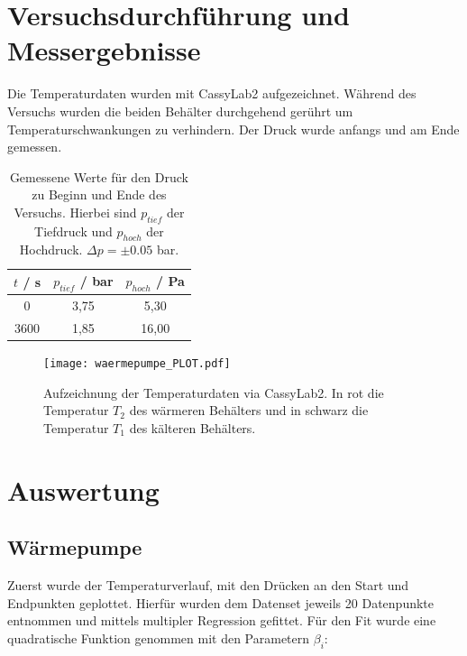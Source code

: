 \documentclass{article}
\begin{document}
\newpage
\section{Versuchsdurchf\"uhrung und Messergebnisse}
Die Temperaturdaten wurden mit CassyLab2 aufgezeichnet. Während des Versuchs wurden die beiden Behälter durchgehend gerührt um Temperaturschwankungen zu verhindern. Der Druck wurde anfangs und am Ende gemessen.

\begin{table}[!h]
\caption{Gemessene Werte für den Druck zu Beginn und Ende des Versuchs. Hierbei sind $p_{tief}$ der Tiefdruck und $p_{hoch}$ der Hochdruck. $\Delta p = \pm 0.05$ bar.}
\centering
\label{tab:items}
\begin{tabular}{|c|c|c|}
\hline
$t$ / s& $p_{tief}$ / bar & $p_{hoch}$ / Pa      \\ \hline
0  & 3,75 & 5,30              \\ \hline
3600  & 1,85 & 16,00             \\ \hline


\end{tabular}
\end{table}


\begin{figure}[!htbp]
\begin{center} \texttt{[image: waermepumpe\_PLOT.pdf]}  
\caption{
Aufzeichnung der Temperaturdaten via CassyLab2. In rot die Temperatur $T_2$ des wärmeren Behälters und in schwarz die Temperatur $T_1$ des kälteren Behälters.}
\label{temperaturverlauf}
\end{center}
\end{figure}
%

\newpage

\section{Auswertung}
\subsection{Wärmepumpe}

Zuerst wurde der Temperaturverlauf, mit den Drücken an den Start und Endpunkten geplottet. Hierfür wurden dem Datenset jeweils 20 Datenpunkte entnommen und mittels multipler Regression gefittet. Für den Fit wurde eine quadratische Funktion genommen mit den Parametern $\beta_i$:
\end{document}
